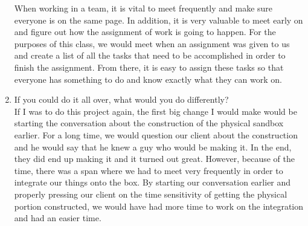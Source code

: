 \documentclass[onecolumn, draftclsnofoot,10pt, compsoc]{IEEEtran}
\begin{document}
\begin{enumerate}
	When working in a team, it is vital to meet frequently and make sure everyone is on the same page.
    In addition, it is very valuable to meet early on and figure out how the assignment of work is going to happen.
    For the purposes of this class, we would meet when an assignment was given to us and create a list of all the tasks that need to be accomplished in order to finish the assignment.
    From there, it is easy to assign these tasks so that everyone has something to do and know exactly what they can work on.
\item If you could do it all over, what would you do differently?\\
	If I was to do this project again, the first big change I would make would be starting the conversation about the construction of the physical sandbox earlier.
    For a long time, we would question our client about the construction and he would say that he knew a guy who would be making it.
    In the end, they did end up making it and it turned out great.
    However, because of the time, there was a span where we had to meet very frequently in order to integrate our things onto the box.
    By starting our conversation earlier and properly pressing our client on the time sensitivity of getting the physical portion constructed, we would have had more time to work on the integration and had an easier time.

\end{enumerate}
		
\end{document}
